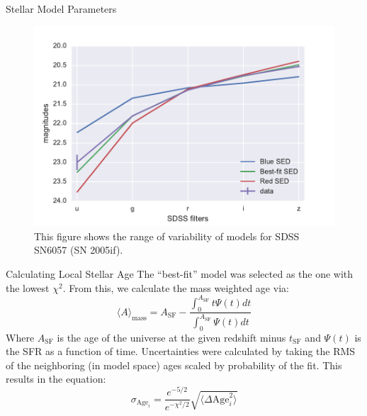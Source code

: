 \documentclass[final]{beamer}
\newlength{\onecolwid}
\begin{document}
\begin{frame}[t]
\begin{columns}[t]
\begin{column}{\onecolwid}
\begin{block}{Stellar Model Parameters}
\begin{figure}
    \begin{minipage}[c]{0.55\onecolwid}
        \includegraphics[width=0.67\onecolwid]{SN6057-Model-Variability.pdf}
    \end{minipage}\hfill
    \begin{minipage}[c]{0.35\onecolwid}
    \caption{This figure shows the range of variability of models for SDSS SN6057 (SN 2005if).} \label{fig:diverse}
  \end{minipage}
\end{figure}

\begin{block}{Calculating Local Stellar Age}
The ``best-fit'' model was selected as the one with the lowest $\chi^2$. From this, we calculate the mass weighted age via:
\begin{equation}
    \langle A \rangle_{\text{mass}}= A_{\text{SF}} - \frac{\int^{A_{\text{SF}}}_{0}t\Psi(t)dt}{\int^{A_{\text{SF}}}_{0}\Psi(t)dt}
\end{equation}
Where $A_{\text{SF}}$ is the age of the universe at the given redshift minus $t_{\text{SF}}$ and $\Psi(t)$ is the SFR as a function of time.
Uncertainties were calculated by taking the RMS of the neighboring (in model space) ages scaled by probability of the fit. This results in the equation:
\begin{equation}
    \sigma_{\text{Age}_{i}} = \frac{e^{-5/2}}{e^{-\chi^2/2}} \sqrt{\langle \Delta \text{Age}_i^2\rangle}
\end{equation}
\end{block}



\end{block}
\end{column}
\end{columns}
\end{frame}
\end{document}
